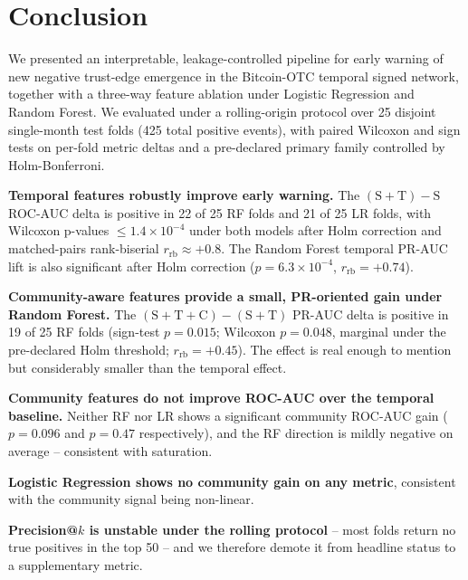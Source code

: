\section{Conclusion}

We presented an interpretable, leakage-controlled pipeline for early
warning of new negative trust-edge emergence in the Bitcoin-OTC
temporal signed network, together with a three-way feature ablation
under Logistic Regression and Random Forest. We evaluated under a
rolling-origin protocol over 25 disjoint single-month test folds
(425 total positive events), with paired Wilcoxon and sign tests on
per-fold metric deltas and a pre-declared primary family controlled
by Holm-Bonferroni.

\textbf{Temporal features robustly improve early warning.} The
$(\mathrm{S}{+}\mathrm{T}) - \mathrm{S}$ ROC-AUC delta is positive in
22 of 25 RF folds and 21 of 25 LR folds, with Wilcoxon p-values
$\leq 1.4\!\times\!10^{-4}$ under both models after Holm correction
and matched-pairs rank-biserial $r_{\mathrm{rb}} \approx +0.8$. The
Random Forest temporal PR-AUC lift is also significant after Holm
correction ($p = 6.3\!\times\!10^{-4}$,
$r_{\mathrm{rb}} = +0.74$).

\textbf{Community-aware features provide a small, PR-oriented gain
under Random Forest.} The
$(\mathrm{S}{+}\mathrm{T}{+}\mathrm{C}) - (\mathrm{S}{+}\mathrm{T})$
PR-AUC delta is positive in 19 of 25 RF folds (sign-test
$p = 0.015$; Wilcoxon $p = 0.048$, marginal under the pre-declared
Holm threshold; $r_{\mathrm{rb}} = +0.45$). The effect is real
enough to mention but considerably smaller than the temporal effect.

\textbf{Community features do not improve ROC-AUC over the temporal
baseline.} Neither RF nor LR shows a significant community ROC-AUC
gain ($p = 0.096$ and $p = 0.47$ respectively), and the RF
direction is mildly negative on average -- consistent with
saturation.

\textbf{Logistic Regression shows no community gain on any metric},
consistent with the community signal being non-linear.

\textbf{Precision@$k$ is unstable under the rolling protocol} --
most folds return no true positives in the top 50 -- and we
therefore demote it from headline status to a supplementary metric.


